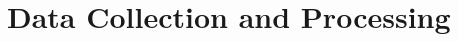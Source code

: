 \documentclass[herrin-thesis.tex]{subfiles}
\begin{document}
\chapter{Data Collection and Processing}
\label{ch:data}
\end{document}
